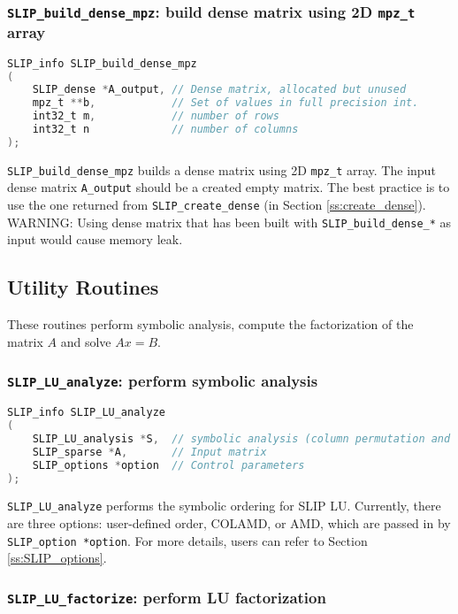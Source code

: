 \documentclass[12pt]{article}
\theoremstyle{definition}
\begin{document}
\cprotect\subsubsection{\verb|SLIP_build_dense_mpz|: build dense matrix using 2D \verb|mpz_t| array}\label{s:user:build_dense_mpz}
\begin{lstlisting}[language=C,frame=single]
SLIP_info SLIP_build_dense_mpz
(
    SLIP_dense *A_output, // Dense matrix, allocated but unused
    mpz_t **b,            // Set of values in full precision int.
    int32_t m,            // number of rows
    int32_t n             // number of columns
);
\end{lstlisting}

\verb|SLIP_build_dense_mpz| builds a dense matrix using 2D \verb|mpz_t| array. The input dense matrix \verb|A_output| should be a created empty matrix. The best practice is to use the one returned from \verb|SLIP_create_dense| (in Section \ref{ss:create_dense}). WARNING: Using dense matrix that has been built with \verb|SLIP_build_dense_*| as input would cause memory leak.





\subsection{Utility Routines}

These routines perform symbolic analysis, compute the factorization of the matrix $A$ and solve $Ax=B$.

\cprotect\subsubsection{\verb|SLIP_LU_analyze|: perform symbolic analysis}
\begin{lstlisting}[language=C,frame=single]
SLIP_info SLIP_LU_analyze
(
    SLIP_LU_analysis *S,  // symbolic analysis (column permutation and nnz L,U)
    SLIP_sparse *A,       // Input matrix
    SLIP_options *option  // Control parameters
);
\end{lstlisting}

\verb|SLIP_LU_analyze| performs the symbolic ordering for SLIP LU. Currently, there are three options: user-defined order, COLAMD, or AMD, which are passed in by \verb|SLIP_option *option|. For more details, users can refer to Section \ref{ss:SLIP_options}.


\cprotect\subsubsection{\verb|SLIP_LU_factorize|: perform LU factorization}\label{ss:SLIP_LU_factorize}
\end{document}
